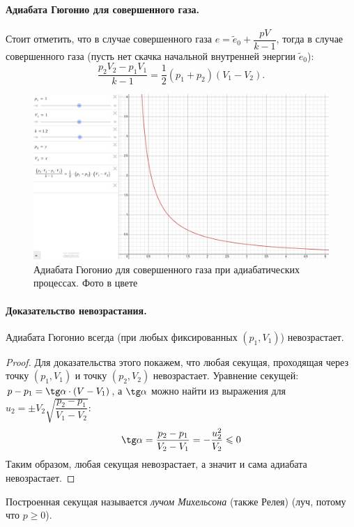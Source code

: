 \paragraph{Адиабата Гюгонио для совершенного газа.}
Стоит отметить, что в случае совершенного газа $e = \tilde e_0 + \dfrac{pV}{k-1}$,
тогда в случае совершенного газа (пусть нет скачка начальной внутренней энергии $\tilde e_0$):
\[
  \dfrac{p_2V_2 - p_1V_1}{k-1} = \dfrac{1}{2} (p_1+p_2) (V_1 - V_2).
\]
\begin{figure}[H]
  \centering
  \includegraphics[width=0.9\linewidth]{img/Gugonio_adiabata_desmos.png}
  \caption{Адиабата Гюгонио для совершенного газа при адиабатических процессах. Фото в цвете}
\end{figure}

\paragraph{Доказательство невозрастания.}
Адиабата Гюгонио всегда (при любых фиксированных $(p_1, V_1)$) невозрастает. 
\begin{proof}
  Для доказательства этого покажем, что любая секущая, проходящая через
  точку $(p_1, V_1)$ и точку $(p_2, V_2)$ невозрастает.
  Уравнение секущей: $p - p_1 = \tg \alpha \cdot (V - V_1)$, 
  а $\tg \alpha$ можно найти из выражения для $u_2 = \pm V_2 \sqrt{\dfrac{p_2-p_1}{V_1 - V_2}}$:
  \[
    \tg \alpha  = \dfrac{p_2 - p_1}{V_2 - V_1} = - \dfrac{u_2^2}{V_2} \leqslant 0
  \]
  Таким образом, любая секущая невозрастает, а значит и сама адиабата невозрастает.
\end{proof}

Построенная секущая называется \emph{лучом Михельсона} (также Релея) (луч, потому что $p \geqslant 0$).
